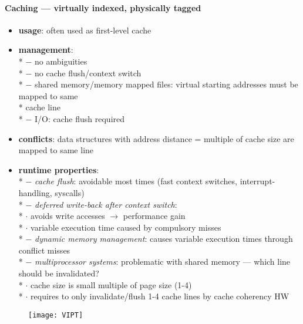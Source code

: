 \paragraph{Caching --- virtually indexed, physically tagged}
\begin{itemize}
  \item \textbf{usage}: often used as first-level cache
  \item \textbf{management}: \\*
    $ - $ no ambiguities \\*
    $ - $ no cache flush/context switch \\*
    $ - $ shared memory/memory mapped files: virtual starting addresses must be mapped to same \\* \phantom{$ - $} \phantom{$ \cdot $} cache line \\*
    $ - $ I/O: cache flush required
  \item \textbf{conflicts}: data structures with address distance = multiple of cache size are mapped to same line
  \item \textbf{runtime properties}: \\*
    $ - $ \emph{cache flush}: avoidable most times (fast context switches, interrupt-handling, syscalls) \\*
    $ - $ \emph{deferred write-back after context switch}: \\*
      \phantom{$ - $} $ \cdot $ avoids write accesses $ \to $ performance gain \\*
      \phantom{$ - $} $ \cdot $ variable execution time caused by compulsory misses \\*
    $ - $ \emph{dynamic memory management}: causes variable execution times through conflict misses \\*
    $ - $ \emph{multiprocessor systems}: problematic with shared memory --- which line should be invalidated? \\*
      \phantom{$ - $} $ \cdot $ cache size is small multiple of page size (1-4) \\*
      \phantom{$ - $} $ \cdot $ requires to only invalidate/flush 1-4 cache lines by cache coherency HW
\end{itemize}
\begin{figure}[h]\centering\label{VIPT}\texttt{[image: VIPT]}\end{figure}

